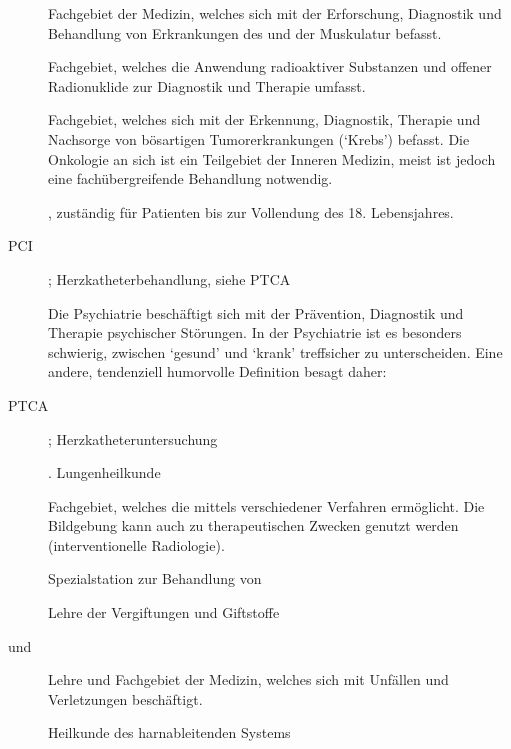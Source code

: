 {\begin{description}
  \item[] Fachgebiet der Medizin, welches sich 
  mit der Erforschung, Diagnostik und Behandlung von
  Erkrankungen des  und der Muskulatur
  befasst.
  \item[] Fachgebiet, welches die
  Anwendung radioaktiver Substanzen und offener Radionuklide
  zur Diagnostik und Therapie umfasst.
  \item[] Fachgebiet, welches sich mit der
  Erkennung, Diagnostik, Therapie und Nachsorge von
  bösartigen Tumorerkrankungen (\enquote*{Krebs}) befasst.
  Die Onkologie an sich ist ein Teilgebiet der Inneren
  Medizin, meist ist jedoch eine fachübergreifende
  Behandlung notwendig.
  \item[]
  \item[] , zuständig für
  Patienten bis zur Vollendung des 18. Lebensjahres.
  \item[PCI]  \emph{}; Herzkatheterbehandlung, siehe PTCA
  \item[]
  \item[] Die Psychiatrie beschäftigt sich
  mit der Prävention, Diagnostik und Therapie psychischer Störungen.
  In der
  Psychiatrie ist es besonders schwierig, zwischen
  \enquote*{gesund} und \enquote*{krank} treffsicher zu
  unterscheiden. Eine andere, tendenziell humorvolle
  Definition besagt daher:
  \item[PTCA]  \emph{}; Herzkatheteruntersuchung
  \item[] . Lungenheilkunde
  
  \item[] Fachgebiet, welches die
   mittels verschiedener Verfahren ermöglicht.
  Die Bildgebung kann auch zu therapeutischen Zwecken genutzt
  werden (interventionelle Radiologie).
  \item[] Spezialstation zur Behandlung von
  \item[] Lehre der Vergiftungen und
  Giftstoffe
  \item[ und ] Lehre und
  Fachgebiet der Medizin, welches sich mit Unfällen und Verletzungen beschäftigt.
  \item[] Heilkunde des harnableitenden Systems
\end{description}
}{}{}{}{}


